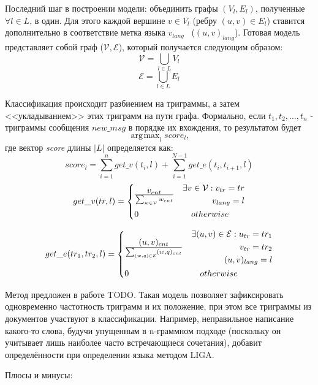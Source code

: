 \documentclass[a4paper, 14pt]{article}
\DeclareMathOperator*{\argmax}{\arg\!\max}
\begin{document}
		Последний шаг в построении модели: объединить графы $(V_{l}, E_{l})$, полученные $\forall l \in L$, в один. 
		Для этого каждой вершине $v \in V_{l}$
		(ребру $(u, v) \in E_{l}$) ставится дополнительно в соответствие метка языка $v_{lang}$ \ ($(u, v)_{lang}$). 
		Готовая модель представляет собой граф
		($\mathcal{V}, \mathcal{E}$), который получается следующим образом:
		$$ \mathcal{V} = \bigcup_{l \in L} V_{l}$$
		$$ \mathcal{E} = \bigcup_{l \in L} E_{l}$$
		
		Классификация происходит разбиением на триграммы, а затем <<укладыванием>> этих триграмм на пути графа. Формально, если
		$t_{1}, t_{2}, \ldots, t_{n}$ - триграммы сообщения $new\_msg$ в порядке их вхождения, то результатом будет
		$$ \argmax_{l} score_{l} ,$$
		где вектор \textit{score} длины $|L|$ определяется как:
		$$ score_{l} = \sum_{i=1}^{n} get\_v(t_{i}, l) + \sum_{i=1}^{N-1} get\_e(t_{i}, t_{i+1}, l)$$
		\[
 		get\_v(tr, l) =
 		  \begin{dcases}
  		   v_{cnt} \over \sum_{w \in \mathcal{V}} w_{cnt} & 
  		   \begin{split} 
					 \exists v \in \mathcal{V}: v_{tr}=tr \\ v_{lang}=l	
  		   	\end{split} \\
  		   0 & \quad otherwise
  		 \end{dcases}
		\]		
		
		\[
 		get\_e(tr_1, tr_2, l) =
 		  \begin{dcases}
  		   (u, v)_{cnt} \over \sum_{(w, q) \in \mathcal{E}} (w, q)_{cnt} & 
  		    \begin{split} 
					 \exists (u, v) \in \mathcal{E}:  u_{tr}=tr_1 \\ v_{tr}=tr_2 \\ (u, v)_{lang}=l
  		   	\end{split} \\
  		   0 & \quad otherwise
  		 \end{dcases}
		\]	
		
		Метод предложен в работе TODO. Такая модель позволяет зафиксировать одновременно частотность триграмм и их положение, при этом все триграммы
		из документов участвуют в классификации. Например, неправильное написание какого-то слова, будучи упущенным в n-граммном подходе (поскольку он
		учитывает лишь наиболее часто встречающиеся сочетания), добавит определённости при определении языка методом LIGA.		
		
		\noindent Плюсы и минусы:
		
\end{document}
